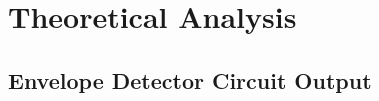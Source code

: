\section{Theoretical Analysis}
\label{sec:analysis}

\subsection{Envelope Detector Circuit Output}
\label{subsec:theo_edc}


